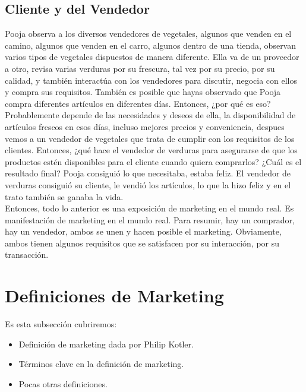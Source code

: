 \documentclass[10pt]{book}
\begin{document}
\subsection{Cliente y del Vendedor}
Pooja observa a los diversos vendedores de vegetales, algunos que venden en el camino, algunos que venden en el carro, algunos dentro de una tienda, observan varios tipos de vegetales dispuestos de manera diferente. Ella va de un proveedor a otro, revisa varias verduras por su frescura, tal vez por su precio, por su calidad, y también interactúa con los vendedores para discutir, negocia con ellos y compra sus requisitos. También es posible que hayas observado que Pooja compra diferentes artículos en diferentes días. Entonces, ¿por qué es eso? Probablemente depende de las necesidades y deseos de ella, la disponibilidad de artículos frescos en esos días, incluso mejores precios y conveniencia, despues vemos  a un vendedor de vegetales que trata de cumplir con los requisitos de los clientes. Entonces, ¿qué hace el vendedor de verduras para asegurarse de que los productos estén disponibles para el cliente cuando quiera comprarlos? ¿Cuál es el resultado final? Pooja consiguió lo que necesitaba, estaba feliz. El vendedor de verduras consiguió su cliente, le vendió los artículos, lo que la hizo feliz y en el trato también se ganaba la vida.\\
Entonces, todo lo anterior es una exposición de marketing en el mundo real. Es manifestación de marketing en el mundo real. Para resumir, hay un comprador, hay un vendedor, ambos se unen y hacen posible el marketing. Obviamente, ambos tienen algunos requisitos que se satisfacen por su interacción, por su transacción.
\section{Definiciones de Marketing}
Es esta subsección cubriremos:
\begin{itemize}
\item Definición de marketing dada por Philip Kotler.
\item Términos clave en la definición de marketing.
\item Pocas otras definiciones.
\end{itemize}
\end{document}
